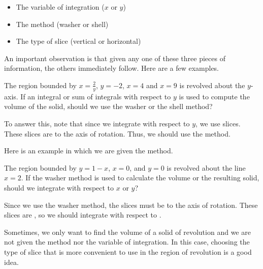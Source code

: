 \documentclass{ximera}
\begin{document}
\begin{itemize}
\item The variable of integration ($x$ or $y$)
\item The method (washer or shell)
\item The type of slice (vertical or horizontal)
\end{itemize}

An important observation is that given any one of these three pieces of information, the others immediately follow.  Here are a few examples.

\begin{example}
The region bounded by $x=\frac{2}{y}$, $y=-2$, $x=4$ and $x=9$ is revolved about the $y$-axis.  If an integral or sum of integrals with respect to $y$ is used to compute the volume of the solid, should we use the washer or the shell method?

\begin{explanation}  To answer this, note that since we integrate with respect to $y$, we use  slices.  These slices are  to the axis of rotation.  Thus, we should use the  method.
\end{explanation}
\end{example}

Here is an example in which we are given the method. 

\begin{example}
The region bounded by $y=1-x$, $x=0$, and $y=0$ is revolved about the line $x=2$.  If the washer method is used to calculate the volume or the resulting solid, should we integrate with respect to $x$ or $y$?  

\begin{explanation}
Since we use the washer method, the slices must be  to the axis of rotation. These slices are , so we should integrate with respect to .

\end{explanation}
\end{example}

Sometimes, we only want to find the volume of a solid of revolution and we are not given the method nor the variable of integration.  In this case, choosing the type of slice that is more convenient to use in the region of revolution is a good idea.
\end{document}
